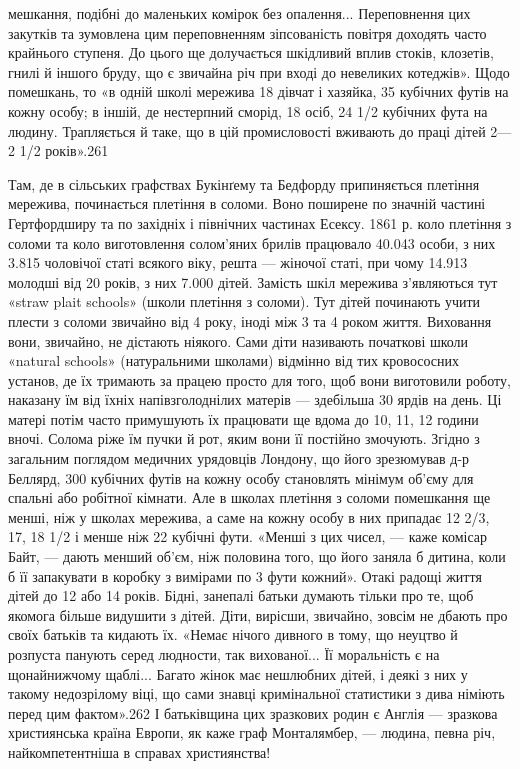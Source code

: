 мешкання, подібні до маленьких комірок без опалення... Переповнення
цих закутків та зумовлена цим переповненням зіпсованість
повітря доходять часто крайнього ступеня. До цього ще
долучається шкідливий вплив стоків, клозетів, гнилі й іншого
бруду, що є звичайна річ при вході до невеликих котеджів». Щодо
помешкань, то «в одній школі мережива 18 дівчат і хазяйка,
35 кубічних футів на кожну особу; в іншій, де нестерпний сморід,
18 осіб, 24  1/2 кубічних фута на людину. Трапляється й таке, що
в цій промисловості вживають до праці дітей 2—2 1/2 років».261

Там, де в сільських графствах Букінґему та Бедфорду припиняється
плетіння мережива, починається плетіння в соломи. Воно
поширене по значній частині Гертфордширу та по західніх і північних
частинах Есексу. 1861 р. коло плетіння з соломи та коло
виготовлення солом’яних брилів працювало 40.043 особи, з них
3.815 чоловічої статі всякого віку, решта — жіночої статі, при
чому 14.913 молодші від 20 років, з них 7.000 дітей. Замість шкіл
мережива з’являються тут «straw plait schools» (школи плетіння
з соломи). Тут дітей починають учити плести з соломи звичайно
від 4 року, іноді між 3 та 4 роком життя. Виховання вони, звичайно,
не дістають ніякого. Сами діти називають початкові школи
«natural schools» (натуральними школами) відмінно від тих кровососних
установ, де їх тримають за працею просто для того, щоб
вони виготовили роботу, наказану їм від їхніх напівзголоднілих
матерів — здебільша 30 ярдів на день. Ці матері потім часто
примушують їх працювати ще вдома до 10, 11, 12 години вночі.
Солома ріже їм пучки й рот, яким вони її постійно змочують.
Згідно з загальним поглядом медичних урядовців Лондону, що
його зрезюмував д-р Беллярд, 300 кубічних футів на кожну
особу становлять мінімум об’єму для спальні або робітної
кімнати. Але в школах плетіння з соломи помешкання ще менші,
ніж у школах мережива, а саме на кожну особу в них припадає
12 2/3, 17, 18 1/2 і менше ніж 22 кубічні фути. «Менші з цих чисел, —
каже комісар Байт, — дають менший об’єм, ніж половина того,
що його заняла б дитина, коли б її запакувати в коробку з вимірами
по 3 фути кожний». Отакі радощі життя дітей до 12 або
14 років. Бідні, занепалі батьки думають тільки про те, щоб
якомога більше видушити з дітей. Діти, вирісши, звичайно,
зовсім не дбають про своїх батьків та кидають їх. «Немає нічого
дивного в тому, що неуцтво й розпуста панують серед людности,
так вихованої... Її моральність є на щонайнижчому щаблі... Багато
жінок має нешлюбних дітей, і деякі з них у такому недозрілому
віці, що сами знавці кримінальної статистики з дива німіють
перед цим фактом».262 І батьківщина цих зразкових родин є
Англія — зразкова християнська країна Европи, як каже граф
Монталямбер, — людина, певна річ, найкомпетентніша в справах
християнства!
